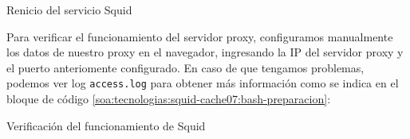 \begin{listing}[H]
  \caption{Renicio del servicio Squid}
  \label{soa:tecnologias:squid-cache06:bash-preparacion}
\end{listing}

Para verificar el funcionamiento del servidor proxy, configuramos manualmente los datos de nuestro proxy en el navegador, ingresando la IP del servidor proxy y el puerto anteriomente configurado.
En caso de que tengamos problemas, podemos ver log \texttt{access.log} para obtener más información como se indica en el bloque de código \autoref{soa:tecnologias:squid-cache07:bash-preparacion}:

\begin{listing}[H]
  \caption{Verificación del funcionamiento de Squid}
  \label{soa:tecnologias:squid-cache07:bash-preparacion}
\end{listing}
